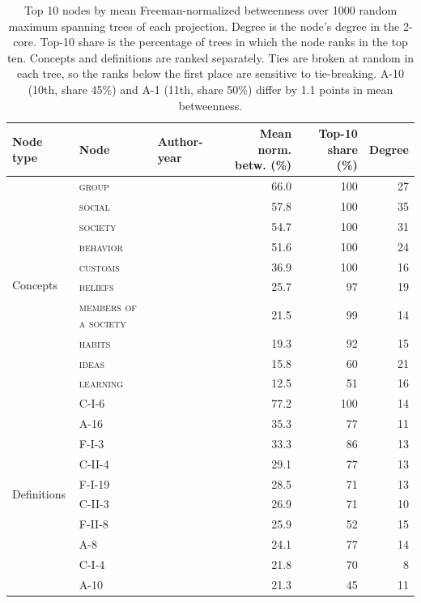 \documentclass[11pt]{article}
\begin{document}
\begin{table}[t]
\centering
\caption{Top 10 nodes by mean Freeman-normalized betweenness over 1000 random maximum spanning trees of each projection. Degree is the node's degree in the 2-core. Top-10 share is the percentage of trees in which the node ranks in the top ten. Concepts and definitions are ranked separately. Ties are broken at random in each tree, so the ranks below the first place are sensitive to tie-breaking. A-10 (10th, share 45\%) and A-1 (11th, share 50\%) differ by 1.1 points in mean betweenness.}
\label{tab:mst-def-betweenness}
\footnotesize
\setlength{\tabcolsep}{3pt}
\begin{tabular}{lllrrr}
\toprule
Node type & Node & Author-year & Mean norm. betw. (\%) & Top-10 share (\%) & Degree \\
\midrule
\multirow{10}{*}{Concepts} & \textsc{group} & & 66.0 & 100 & 27 \\
 & \textsc{social} & & 57.8 & 100 & 35 \\
 & \textsc{society} & & 54.7 & 100 & 31 \\
 & \textsc{behavior} & & 51.6 & 100 & 24 \\
 & \textsc{customs} & & 36.9 & 100 & 16 \\
 & \textsc{beliefs} & & 25.7 & 97 & 19 \\
 & \textsc{members of a society} & & 21.5 & 99 & 14 \\
 & \textsc{habits} & & 19.3 & 92 & 15 \\
 & \textsc{ideas} & & 15.8 & 60 & 21 \\
 & \textsc{learning} & & 12.5 & 51 & 16 \\
\midrule
\multirow{10}{*}{Definitions} & C-I-6 & \citealt{gillin1942} & 77.2 & 100 & 14 \\
 & A-16 & \citealt{bidney1947} & 35.3 & 77 & 11 \\
 & F-I-3 & \citealt{folsom1931} & 33.3 & 86 & 13 \\
 & C-II-4 & \citealt{bidney1946} & 29.1 & 77 & 13 \\
 & F-I-19 & \citealt{murdock1949a} & 28.5 & 71 & 13 \\
 & C-II-3 & \citealt{bidney1942} & 26.9 & 71 & 10 \\
 & F-II-8 & \citealt{taylor1948} & 25.9 & 52 & 15 \\
 & A-8 & \citealt{hiller1933} & 24.1 & 77 & 14 \\
 & C-I-4 & \citealt{klineberg1935} & 21.8 & 70 & 8 \\
 & A-10 & \citealt{linton1936} & 21.3 & 45 & 11 \\

\end{tabular}
\end{table}
\end{document}
